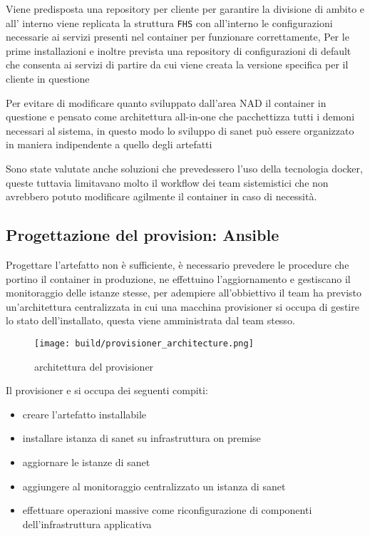 Viene predisposta una repository per cliente per garantire la divisione di ambito e all' interno viene replicata la struttura \verb|FHS| con all'interno le configurazioni necessarie ai servizi presenti nel container per funzionare correttamente, Per le prime installazioni e inoltre prevista una repository di configurazioni di default che consenta ai servizi di partire da cui viene creata la versione specifica per il cliente in questione

Per evitare di modificare quanto sviluppato dall'area NAD il container in questione e pensato come architettura all-in-one che pacchettizza tutti i demoni necessari al sistema, in questo modo lo sviluppo di sanet può essere organizzato in maniera indipendente a quello degli artefatti

Sono state valutate anche soluzioni che prevedessero l'uso della tecnologia docker\cite{docker}, queste tuttavia limitavano molto il workflow dei team sistemistici che non avrebbero potuto modificare agilmente il container in caso di necessità.

\newpage
\subsection{Progettazione del provision: Ansible}

Progettare l'artefatto non è sufficiente, è necessario prevedere le procedure che portino il container in produzione, ne effettuino l'aggiornamento e gestiscano il monitoraggio delle istanze stesse, per adempiere all'obbiettivo il team ha previsto un'architettura centralizzata in cui una macchina provisioner si occupa di gestire lo stato dell'installato, questa viene amministrata dal team stesso.

\begin{figure}[H]
    \centering
    \texttt{[image: build/provisioner\_architecture.png]}
    \caption{architettura del provisioner}
    \label{fig:enter-label}
\end{figure}

Il provisioner e si occupa dei seguenti compiti:

\begin{itemize}
  \item{creare l'artefatto installabile}
  \item{installare istanza di sanet su infrastruttura on premise }
  \item{aggiornare le istanze di sanet}
  \item{aggiungere al monitoraggio centralizzato un istanza di sanet}
  \item{effettuare operazioni massive come riconfigurazione di componenti dell'infrastruttura applicativa}
\end{itemize}

